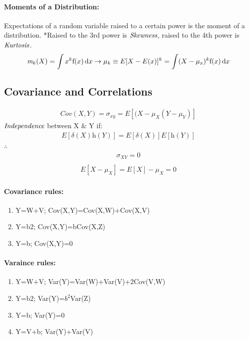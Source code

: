 \paragraph{Moments of a Distribution:}
Expectations of a random variable raised to a certain power is the moment of a distribution. *Raised to the 3rd power is $\emph{Skewness}$, raised to the 4th power is $\emph{Kurtosis}$.\\ 

\begin{eqnarray}
\emph{m}_{k}(X)=\int x^{k} \mathrm{f}(x)\,\mathrm{d}x\rightarrow \mu_{k}\equiv E[X-E(x)]^{k}=\int (X-\mu_{x})^{k} \mathrm{f}(x)\,\mathrm{d}x
\end{eqnarray}

\subsection{Covariance and Correlations}
\begin{eqnarray}
Cov(X,Y)=\sigma_{xy}=E[(X-\mu_{X}(Y-\mu_{Y})]
\end{eqnarray}
$\emph{Independence}$ between X $\&$ Y if:
\begin{eqnarray}
E[\delta(X)\textit{h}(Y)]=E[\delta(X)]E[\textit{h}(Y)] 
\end{eqnarray}
$\therefore$
\begin{eqnarray}
\sigma_{XY}=0\\
\end{eqnarray}
\begin{eqnarray}
E[X-\mu_{X}]=E[X]-\mu_{X}=0
\end{eqnarray}


\paragraph{Covariance rules:}
\begin{enumerate}[(1)]
\item Y=W+V; Cov(X,Y)=Cov(X,W)+Cov(X,V)
\item Y=b2; Cov(X,Y)=bCov(X,Z)
\item Y=b; Cov(X,Y)=0
\end{enumerate}

\paragraph{Varaince rules:}
\begin{enumerate}[(1)]
\item Y=W+V; Var(Y)=Var(W)+Var(V)+2Cov(V,W)
\item Y=b2; Var(Y)=$b^{2}$Var(Z)
\item Y=b; Var(Y)=0
\item Y=V+b; Var(Y)+Var(V)
\end{enumerate}
